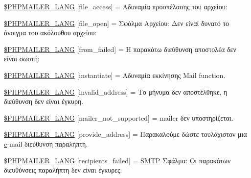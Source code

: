\begin{DoxyCompactItemize}
\item 
\hyperlink{phpmailer_8lang-el_8php_a7e83349023b856ef9e5c46e30ae6d51e}{\$\+P\+H\+P\+M\+A\+I\+L\+E\+R\+\_\+\+L\+A\+NG} \mbox{[}\textquotesingle{}file\+\_\+access\textquotesingle{}\mbox{]} = \textquotesingle{}Αδυναμία προσπέλασης του αρχείου\+: \textquotesingle{}
\item 
\hyperlink{phpmailer_8lang-el_8php_a28d1a6517bf4c942a0ddd506188ad2e0}{\$\+P\+H\+P\+M\+A\+I\+L\+E\+R\+\_\+\+L\+A\+NG} \mbox{[}\textquotesingle{}file\+\_\+open\textquotesingle{}\mbox{]} = \textquotesingle{}Σφάλμα Αρχείου\+: Δεν είναί δυνατό το άνοιγμα του ακόλουθου αρχείου\+: \textquotesingle{}
\item 
\hyperlink{phpmailer_8lang-el_8php_adf832ae12155a09be077c6d5e4fd7e22}{\$\+P\+H\+P\+M\+A\+I\+L\+E\+R\+\_\+\+L\+A\+NG} \mbox{[}\textquotesingle{}from\+\_\+failed\textquotesingle{}\mbox{]} = \textquotesingle{}Η παρακάτω διεύθυνση αποστολέα δεν είναι σωστή\+: \textquotesingle{}
\item 
\hyperlink{phpmailer_8lang-el_8php_ad58dde16780f4770ccf4dd282ea1f5ad}{\$\+P\+H\+P\+M\+A\+I\+L\+E\+R\+\_\+\+L\+A\+NG} \mbox{[}\textquotesingle{}instantiate\textquotesingle{}\mbox{]} = \textquotesingle{}Αδυναμία εκκίνησης Mail function.\textquotesingle{}
\item 
\hyperlink{phpmailer_8lang-el_8php_a42d61bcea4c79599ecb44fd062f54d47}{\$\+P\+H\+P\+M\+A\+I\+L\+E\+R\+\_\+\+L\+A\+NG} \mbox{[}\textquotesingle{}invalid\+\_\+address\textquotesingle{}\mbox{]} = \textquotesingle{}Το μήνυμα δεν αποστέλθηκε, η διεύθυνση δεν είναι έγκυρη.\textquotesingle{}
\item 
\hyperlink{phpmailer_8lang-el_8php_aa2ebcb8833ee83a7ad67401c4bb3a6ad}{\$\+P\+H\+P\+M\+A\+I\+L\+E\+R\+\_\+\+L\+A\+NG} \mbox{[}\textquotesingle{}mailer\+\_\+not\+\_\+supported\textquotesingle{}\mbox{]} = \textquotesingle{} mailer δεν υποστηρίζεται.\textquotesingle{}
\item 
\hyperlink{phpmailer_8lang-el_8php_a8b97897c2406b7392b056f375feeefbb}{\$\+P\+H\+P\+M\+A\+I\+L\+E\+R\+\_\+\+L\+A\+NG} \mbox{[}\textquotesingle{}provide\+\_\+address\textquotesingle{}\mbox{]} = \textquotesingle{}Παρακαλούμε δώστε τουλάχιστον μια \hyperlink{jquery-ui_8min_8js_abea95a4e94bc6f4151d5683d4c12c3f4}{e}-\/mail διεύθυνση παραλήπτη.\textquotesingle{}
\item 
\hyperlink{phpmailer_8lang-el_8php_a7589d30bb9b368327c2df015f3e6bcba}{\$\+P\+H\+P\+M\+A\+I\+L\+E\+R\+\_\+\+L\+A\+NG} \mbox{[}\textquotesingle{}recipients\+\_\+failed\textquotesingle{}\mbox{]} = \textquotesingle{}\hyperlink{class_s_m_t_p}{S\+M\+TP} Σφάλμα\+: Οι παρακάτων διευθύνσεις παραλήπτη δεν είναι έγκυρες\+: \textquotesingle{}

\end{DoxyCompactItemize}

